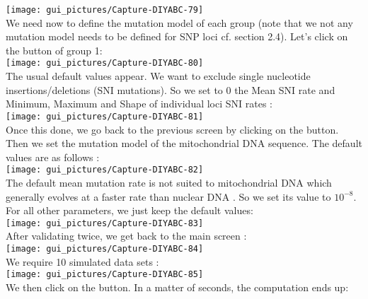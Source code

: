 \texttt{[image: gui\_pictures/Capture-DIYABC-79]} \\


We need now to define the mutation model of each group (note that
we not any mutation model needs to be defined for SNP loci cf. section
2.4). Let's click on the  button
of group 1:\\


\texttt{[image: gui\_pictures/Capture-DIYABC-80]} \\


The usual default values appear. We want to exclude single nucleotide
insertions/deletions (SNI mutations). So we set to 0 the Mean SNI
rate and Minimum, Maximum and Shape of individual loci SNI rates :\\


\texttt{[image: gui\_pictures/Capture-DIYABC-81]} \\


Once this done, we go back to the previous screen by clicking on the
 button. Then we set the mutation model
of the mitochondrial DNA sequence. The default values are as follows
:\\


\texttt{[image: gui\_pictures/Capture-DIYABC-82]} \\


The default mean mutation rate is not suited to mitochondrial DNA
which generally evolves at a faster rate than nuclear DNA \citep{HL2008}.
So we set its value to $10^{-8}$. For all other parameters, we just
keep the default values:\\


\texttt{[image: gui\_pictures/Capture-DIYABC-83]} \\


After validating twice, we get back to the main screen :\\


\texttt{[image: gui\_pictures/Capture-DIYABC-84]} \\


We require 10 simulated data sets :\\


\texttt{[image: gui\_pictures/Capture-DIYABC-85]} \\


\newpage{}We then click on the 
button. In a matter of seconds, the computation ends up:\\


